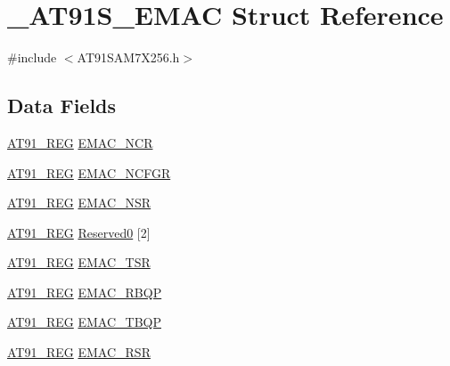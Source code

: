 \hypertarget{struct__AT91S__EMAC}{\section{\-\_\-\-A\-T91\-S\-\_\-\-E\-M\-A\-C Struct Reference}
\label{struct__AT91S__EMAC}
}


{\ttfamily \#include $<$A\-T91\-S\-A\-M7\-X256.\-h$>$}

\subsection*{Data Fields}
\begin{DoxyCompactItemize}
\item 
\hyperlink{GCC_2ARM7__AT91SAM7S_2AT91SAM7X256_8h_a712ad5a1ac1bd02f3e95a7526c283ce1}{A\-T91\-\_\-\-R\-E\-G} \hyperlink{struct__AT91S__EMAC_aaaaab029abe728349d594910b20c05b2}{E\-M\-A\-C\-\_\-\-N\-C\-R}
\item 
\hyperlink{GCC_2ARM7__AT91SAM7S_2AT91SAM7X256_8h_a712ad5a1ac1bd02f3e95a7526c283ce1}{A\-T91\-\_\-\-R\-E\-G} \hyperlink{struct__AT91S__EMAC_ae93479c562d6f1d0b27426600663a06e}{E\-M\-A\-C\-\_\-\-N\-C\-F\-G\-R}
\item 
\hyperlink{GCC_2ARM7__AT91SAM7S_2AT91SAM7X256_8h_a712ad5a1ac1bd02f3e95a7526c283ce1}{A\-T91\-\_\-\-R\-E\-G} \hyperlink{struct__AT91S__EMAC_ae119641208e95ec32c33d7815ff6a671}{E\-M\-A\-C\-\_\-\-N\-S\-R}
\item 
\hyperlink{GCC_2ARM7__AT91SAM7S_2AT91SAM7X256_8h_a712ad5a1ac1bd02f3e95a7526c283ce1}{A\-T91\-\_\-\-R\-E\-G} \hyperlink{struct__AT91S__EMAC_afe82bab0fca2b9327958105138c7ceb9}{Reserved0} \mbox{[}2\mbox{]}
\item 
\hyperlink{GCC_2ARM7__AT91SAM7S_2AT91SAM7X256_8h_a712ad5a1ac1bd02f3e95a7526c283ce1}{A\-T91\-\_\-\-R\-E\-G} \hyperlink{struct__AT91S__EMAC_a0246331d44896d065805c880720e19ef}{E\-M\-A\-C\-\_\-\-T\-S\-R}
\item 
\hyperlink{GCC_2ARM7__AT91SAM7S_2AT91SAM7X256_8h_a712ad5a1ac1bd02f3e95a7526c283ce1}{A\-T91\-\_\-\-R\-E\-G} \hyperlink{struct__AT91S__EMAC_ab6221a2aa14324df4a7b40ec5a1dd91f}{E\-M\-A\-C\-\_\-\-R\-B\-Q\-P}
\item 
\hyperlink{GCC_2ARM7__AT91SAM7S_2AT91SAM7X256_8h_a712ad5a1ac1bd02f3e95a7526c283ce1}{A\-T91\-\_\-\-R\-E\-G} \hyperlink{struct__AT91S__EMAC_a804aaca66507401123632fad8ac52667}{E\-M\-A\-C\-\_\-\-T\-B\-Q\-P}
\item 
\hyperlink{GCC_2ARM7__AT91SAM7S_2AT91SAM7X256_8h_a712ad5a1ac1bd02f3e95a7526c283ce1}{A\-T91\-\_\-\-R\-E\-G} \hyperlink{struct__AT91S__EMAC_a17c19d4ab0b20f891a1c284cf0a89940}{E\-M\-A\-C\-\_\-\-R\-S\-R}

\end{DoxyCompactItemize}
